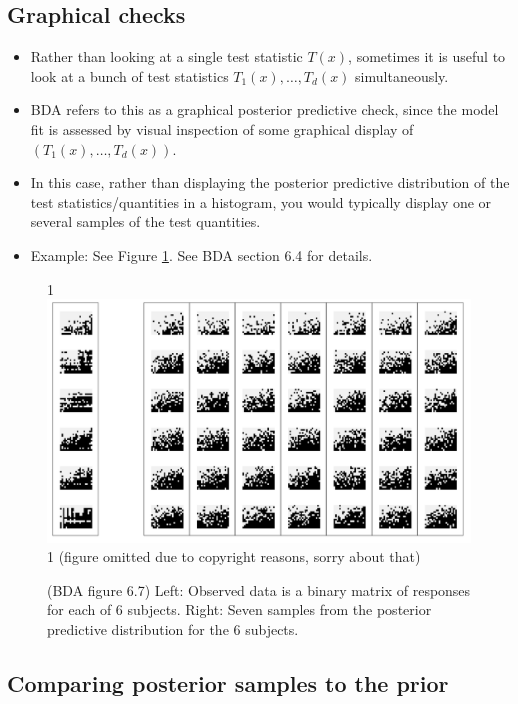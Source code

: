 \documentclass[12pt]{article}
\newcommand{\blind}{1}
\begin{document}
\subsection{Graphical checks}
\begin{itemize}
\item Rather than looking at a single test statistic $T(x)$, sometimes it is useful to look at a bunch of test statistics $T_1(x),\ldots,T_d(x)$ simultaneously.
\item BDA refers to this as a graphical posterior predictive check, since the model fit is assessed by visual inspection of some graphical display of $(T_1(x),\ldots,T_d(x))$.
\item In this case, rather than displaying the posterior predictive distribution of the test statistics/quantities in a histogram, you would typically display one or several samples of the test quantities.
\item Example: See Figure \ref{figure:graphical}. See BDA section 6.4 for details.
\end{itemize}

\begin{figure}
\begin{center}
\blind {
\includegraphics[width=1\textwidth]{graphical.png}
} \fi
{}\blind { (figure omitted due to copyright reasons, sorry about that) } \fi
\end{center}
\caption{(BDA figure 6.7) Left: Observed data is a binary matrix of responses for each of 6 subjects. Right: Seven samples from the posterior predictive distribution for the 6 subjects.}
\label{figure:graphical}
\end{figure}



\subsection{Comparing posterior samples to the prior}
\end{document}

